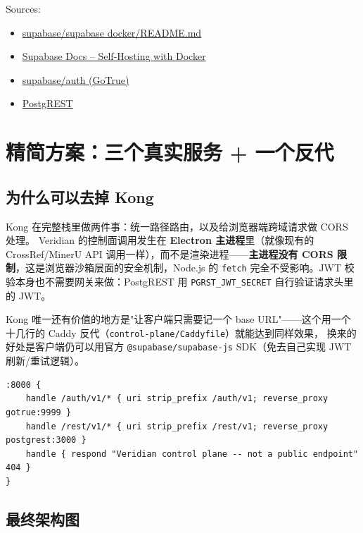 \documentclass[12pt, a4paper]{article}
\begin{document}
Sources:
\begin{itemize}[leftmargin=2em, itemsep=1pt]
  \item \href{https://github.com/supabase/supabase/blob/master/docker/README.md}{supabase/supabase docker/README.md}
  \item \href{https://supabase.com/docs/guides/self-hosting/docker}{Supabase Docs -- Self-Hosting with Docker}
  \item \href{https://github.com/supabase/auth}{supabase/auth (GoTrue)}
  \item \href{https://github.com/PostgREST/postgrest}{PostgREST}
\end{itemize}

\section{精简方案：三个真实服务 + 一个反代}

\subsection{为什么可以去掉 Kong}

Kong 在完整栈里做两件事：统一路径路由，以及给浏览器端跨域请求做 CORS 处理。
Veridian 的控制面调用发生在 \textbf{Electron 主进程}里（就像现有的
CrossRef/MinerU API 调用一样），而不是渲染进程——\textbf{主进程没有
CORS 限制}，这是浏览器沙箱层面的安全机制，Node.js 的 \texttt{fetch}
完全不受影响。JWT 校验本身也不需要网关来做：PostgREST 用
\texttt{PGRST\_JWT\_SECRET} 自行验证请求头里的 JWT。

Kong 唯一还有价值的地方是"让客户端只需要记一个 base URL"——这个用一个
十几行的 Caddy 反代（\texttt{control-plane/Caddyfile}）就能达到同样效果，
换来的好处是客户端仍可以用官方
\texttt{@supabase/supabase-js} SDK（免去自己实现 JWT 刷新/重试逻辑）。

\begin{lstlisting}[language={}, numbers=none]
:8000 {
	handle /auth/v1/* { uri strip_prefix /auth/v1; reverse_proxy gotrue:9999 }
	handle /rest/v1/* { uri strip_prefix /rest/v1; reverse_proxy postgrest:3000 }
	handle { respond "Veridian control plane -- not a public endpoint" 404 }
}
\end{lstlisting}

\subsection{最终架构图}
\end{document}
